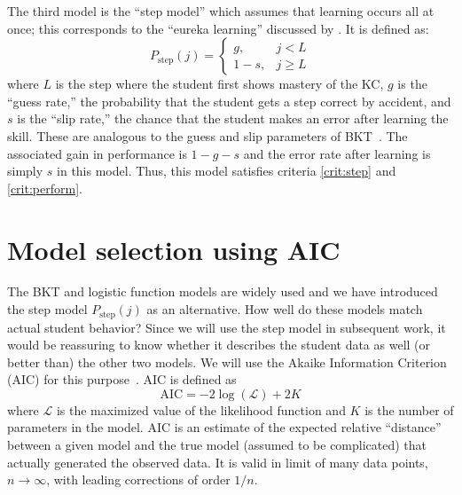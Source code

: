 \documentclass{edm_template}
\begin{document}
The third model is the ``step model'' which assumes that learning 
occurs all at once; this corresponds to the ``eureka learning''
discussed by \cite{baker_detecting_2011}.   
It is defined as:
%
\begin{equation}
    P_\mathrm{step}(j)= \left\{\begin{array}{cc}
                 g, & j<L \\
                 1-s, & j\ge L 
                 \end{array} \right. 
\end{equation}
%
where $L$ is the step where the student first shows mastery of the KC,
$g$ is the ``guess rate,'' the probability that the student gets a
step correct by accident, and $s$ is the ``slip rate,'' the chance
that the student makes an error after learning the skill.  These are
analogous to the guess and slip parameters of
BKT~\cite{corbett_knowledge_1995}.  The associated gain in performance
is $1-g-s$ and the error rate after learning is simply $s$ in this
model.  Thus, this model satisfies criteria \ref{crit:step} and
\ref{crit:perform}.


\section{Model selection using AIC}
\label{model-selection}

The BKT and logistic function models are widely used and
we have introduced the step model $P_\mathrm{step}(j)$
as an alternative.  How
well do these models match actual student behavior?
Since we will use the step model in subsequent
work, it would be reassuring to know whether it describes the student data as 
well (or better than) the other two models.  We will use the Akaike Information Criterion (AIC) for this purpose~\cite{akaike_new_1974,burnham_model_2002}.
AIC is defined as
%
\begin{equation}
   \mathrm{AIC}= -2 \log\left(\mathcal{L}\right) + 2K
\end{equation}
% 
where $\mathcal{L}$ is the maximized value of the likelihood function
and $K$ is the number of parameters in the model.
 AIC is an estimate of the expected relative ``distance''
between a given model and the true model (assumed to be complicated) 
that actually generated the observed data.  It is valid in limit of 
many data points, $n\to\infty$, with leading corrections of order $1/n$.
\end{document}
